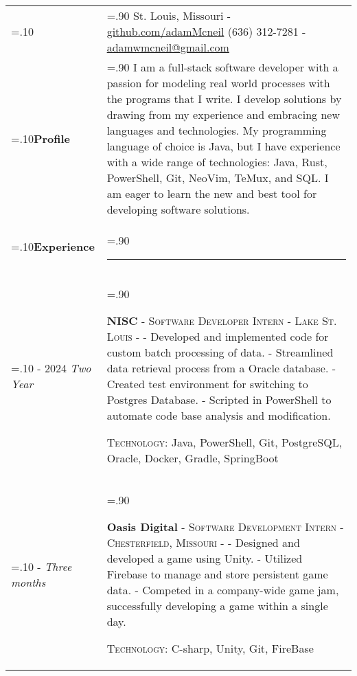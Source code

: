 \documentclass[10pt]{article}
\newcommand{\timeFrame}[3] {
  \if\relax\detokenize{#2}\relax
    #1
  \else
    #1 - #2
  \fi
  \newline
  \scriptsize \textit{#3}
}
\newcommand{\entry}[6] {
  \textbf{#1}
  \if\relax\detokenize{#2}\relax
  \else
       - \textsc{#2}
  \fi
  \if\relax\detokenize{#3}\relax
  \else
      - \textsc{#3}
  \fi
  \if\relax\detokenize{#4}\relax
  \else
      - \href{https://#4}{#4}
  \fi
  \newline #5
  \if\relax\detokenize{#6}\relax
  \else
      \newline \textsc{Technology:} #6
  \fi
  \\
}
\newcommand{\horizontalLine}[0] {
    \noindent\rule{.90\linewidth}{0.4pt}
}
\begin{document}

\begin{tabularx}{\linewidth}{>{\hsize=.10\hsize}X>{\hsize=.90\hsize}X}

{\bfseries\large Adam McNeil} &
St. Louis, Missouri - \href{https://github.com/adamMcneil}{github.com/adamMcneil}\newline
{(636) 312-7281 \hspace{5.5mm} - \href{mailto:adamwmcneil@gmail.com}{adamwmcneil@gmail.com}} \\[5pt]

\textbf{Profile} &
{I am a full-stack software developer with a passion for modeling real world processes with the programs that I write.
 I develop solutions by drawing from my experience and embracing new languages and technologies.
 My programming language of choice is Java, but I have experience with a wide range of technologies: Java, Rust, PowerShell, Git, NeoVim, TeMux, and SQL.
 I am eager to learn the new and best tool for developing software solutions.
 \newline
} \\

\textbf{Experience} & \horizontalLine \\

\timeFrame{2023}{2024}{Two Year} &
\entry{NISC}
  {Software Developer Intern}
  {Lake St. Louis}
  {}
  {
  - Developed and implemented code for custom batch processing of data. \newline
  - Streamlined data retrieval process from a Oracle database. \newline
  - Created test environment for switching to Postgres Database. \newline
  - Scripted in PowerShell to automate code base analysis and modification.
  }
  {Java, PowerShell, Git, PostgreSQL, Oracle, Docker, Gradle, SpringBoot \newline}

\timeFrame{2022}{}{Three months} &
\entry{Oasis Digital}
  {Software Development Intern}
  {Chesterfield, Missouri}
  {}
  {
  - Designed and developed a game using Unity. \newline
  - Utilized Firebase to manage and store persistent game data. \newline
  - Competed in a company-wide game jam, successfully developing a game within a single day.
  }
  {C-sharp, Unity, Git, FireBase \newline}



\end{tabularx}
\end{document}
